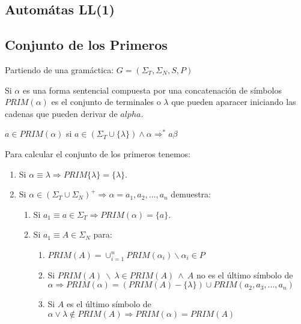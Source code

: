 {\subsection{Automátas LL(1)}

\subsection{Conjunto de los Primeros}

Partiendo de una gram\'actica: $G = (\Sigma_{T}, \Sigma_{N}, S, P)$


 Si $\alpha$ es una forma sentencial compuesta por una concatenaci\'on de
s\'imbolos $PRIM(\alpha)$ es el conjunto de terminales o $\lambda$ que pueden
aparacer iniciando las cadenas que pueden derivar de $alpha$.


\form $a \in PRIM(\alpha)$ si $a \in (\Sigma_{T} \cup \{\lambda\}) \wedge \alpha
\Longrightarrow^{*} a\beta$

\regl Para calcular el conjunto de los primeros tenemos:

\begin{enumerate}

\item Si $\alpha \equiv \lambda \Rightarrow PRIM\{\lambda\} = \{\lambda\}$.

\item Si $\alpha \in (\Sigma_T \cup \Sigma_N)^+ \Rightarrow \alpha = a_1, a_2, \ldots, a_n$ demuestra:
 
\begin{enumerate}

\item Si $a_1 \equiv a \in \Sigma_T \Rightarrow PRIM(\alpha) = \{a\}$.  

\item Si $a_1 \equiv A \in \Sigma_N$ para:

\begin{enumerate}

\item $PRIM(A) = \cup^n_{i=1} PRIM(\alpha_i) \backslash \alpha_i \in P$

\item Si $PRIM(A)\ \backslash\ \lambda \in PRIM(A)\ \wedge\ A$ no es el último símbolo de $\alpha \Rightarrow PRIM(\alpha) = (PRIM(A)-\{\lambda\}) \cup PRIM (a_2, a_3, \ldots, a_n)$

\item Si $A$ es el último símbolo de $\alpha \vee \lambda \notin PRIM(A) \Rightarrow PRIM(\alpha) = PRIM(A)$


\end{enumerate}
\end{enumerate}
\end{enumerate}}
